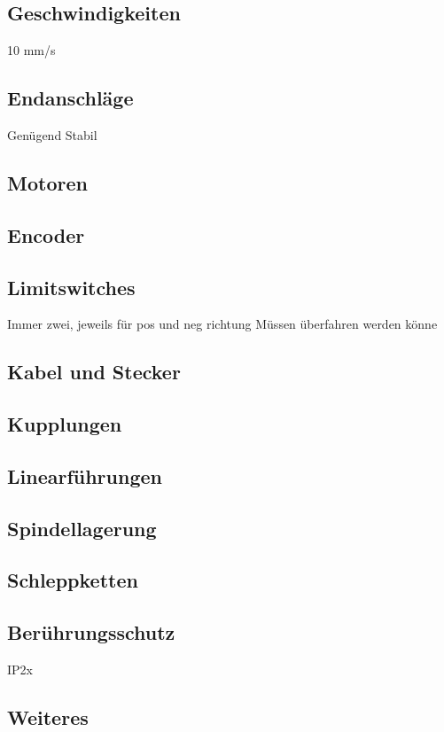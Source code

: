 \subsection{Geschwindigkeiten}
10 mm/s

\subsection{Endanschläge}
Genügend Stabil

\subsection{Motoren}

\subsection{Encoder}

\subsection{Limitswitches}
Immer zwei, jeweils für pos und neg richtung
Müssen überfahren werden könne

\subsection{Kabel und Stecker}

\subsection{Kupplungen}

\subsection{Linearführungen}

\subsection{Spindellagerung}

\subsection{Schleppketten}

\subsection{Berührungsschutz}
IP2x
	
\subsection{Weiteres}


% 

